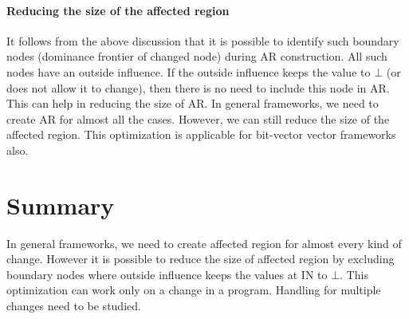 \documentclass[11pt,a4paper,openright]{report}
\begin{document}
\paragraph{Reducing the size of the affected region}
It follows from the above discussion that it is possible to identify such boundary nodes (dominance frontier of changed node) during AR construction.
All such nodes have an outside influence. If the outside influence keeps the value to $\bot$ (or does not allow it to change), 
then there is no need to include this node in AR. This can help in reducing the size of AR.
In general frameworks, we need to create AR for almost all the cases. However, we can still reduce the size of the affected region. This optimization is applicable
for bit-vector vector frameworks also. 

 

\section{Summary}
In general frameworks, we need to create affected region for almost every kind of change. However it is possible to reduce the size of affected region by excluding boundary
nodes where outside influence keeps the values at IN to $\bot$. This optimization can work only on a change in a program. Handling for multiple changes need to be studied.
\end{document}
